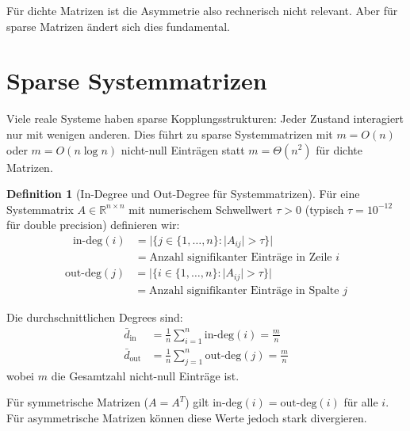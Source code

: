 \documentclass[a4paper,12pt]{report}
\theoremstyle{definition}
\newtheorem{definition}{Definition}
\begin{document}
	Für dichte Matrizen ist die Asymmetrie also rechnerisch nicht relevant. Aber für sparse Matrizen ändert sich dies fundamental.
	
	\section{Sparse Systemmatrizen}
	
	Viele reale Systeme haben sparse Kopplungsstrukturen: Jeder Zustand interagiert nur mit wenigen anderen. Dies führt zu sparse Systemmatrizen mit $m = O(n)$ oder $m = O(n \log n)$ nicht-null Einträgen statt $m = \Theta(n^2)$ für dichte Matrizen.
	
	\begin{definition}[In-Degree und Out-Degree für Systemmatrizen]
		Für eine Systemmatrix $A \in \mathbb{R}^{n \times n}$ mit numerischem Schwellwert $\tau > 0$ (typisch $\tau = 10^{-12}$ für double precision) definieren wir:
		\begin{align}
			\text{in-deg}(i) &= |\{j \in \{1,\ldots,n\} : |A_{ij}| > \tau\}| \\
			&= \text{Anzahl signifikanter Einträge in Zeile } i
		\end{align}
		\begin{align}
			\text{out-deg}(j) &= |\{i \in \{1,\ldots,n\} : |A_{ij}| > \tau\}| \\
			&= \text{Anzahl signifikanter Einträge in Spalte } j
		\end{align}
		
		Die durchschnittlichen Degrees sind:
		\begin{align}
			\bar{d}_{\text{in}} &= \frac{1}{n} \sum_{i=1}^{n} \text{in-deg}(i) = \frac{m}{n} \\
			\bar{d}_{\text{out}} &= \frac{1}{n} \sum_{j=1}^{n} \text{out-deg}(j) = \frac{m}{n}
		\end{align}
		wobei $m$ die Gesamtzahl nicht-null Einträge ist.
	\end{definition}
	
	Für symmetrische Matrizen ($A = A^T$) gilt $\text{in-deg}(i) = \text{out-deg}(i)$ für alle $i$. Für asymmetrische Matrizen können diese Werte jedoch stark divergieren.
	
\end{document}
